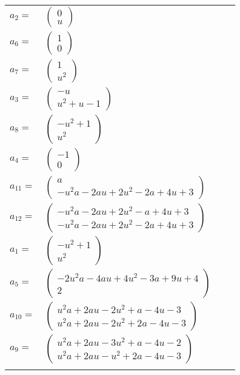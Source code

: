 \documentclass[1p]{elsarticle_modified}
\theoremstyle{definition}
\begin{document}
\begin{tabular}{m{7pt} m{180pt} m{7pt} m{180pt} }
\flushright $a_{2}=$&$\begin{pmatrix}0\\u\end{pmatrix}$ \\
\flushright $a_{6}=$&$\begin{pmatrix}1\\0\end{pmatrix}$ \\
\flushright $a_{7}=$&$\begin{pmatrix}1\\u^2\end{pmatrix}$ \\
\flushright $a_{3}=$&$\begin{pmatrix}- u\\u^2+u-1\end{pmatrix}$ \\
\flushright $a_{8}=$&$\begin{pmatrix}- u^2+1\\u^2\end{pmatrix}$ \\
\flushright $a_{4}=$&$\begin{pmatrix}-1\\0\end{pmatrix}$ \\
\flushright $a_{11}=$&$\begin{pmatrix}a\\- u^2 a-2 a u+2 u^2-2 a+4 u+3\end{pmatrix}$ \\
\flushright $a_{12}=$&$\begin{pmatrix}- u^2 a-2 a u+2 u^2- a+4 u+3\\- u^2 a-2 a u+2 u^2-2 a+4 u+3\end{pmatrix}$ \\
\flushright $a_{1}=$&$\begin{pmatrix}- u^2+1\\u^2\end{pmatrix}$ \\
\flushright $a_{5}=$&$\begin{pmatrix}-2 u^2 a-4 a u+4 u^2-3 a+9 u+4\\2\end{pmatrix}$ \\
\flushright $a_{10}=$&$\begin{pmatrix}u^2 a+2 a u-2 u^2+a-4 u-3\\u^2 a+2 a u-2 u^2+2 a-4 u-3\end{pmatrix}$ \\
\flushright $a_{9}=$&$\begin{pmatrix}u^2 a+2 a u-3 u^2+a-4 u-2\\u^2 a+2 a u- u^2+2 a-4 u-3\end{pmatrix}$\\&\end{tabular}
\end{document}
